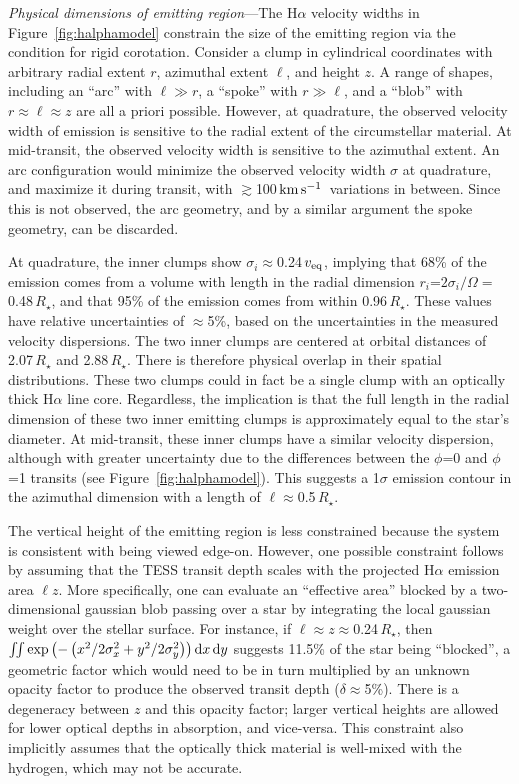 \documentclass[11pt,twocolumn,tighten,linenumbers]{aastex7}
\newcommand{\kms}{\ensuremath{\rm km\,s^{-1}}}
\begin{document}
{\it Physical dimensions of emitting region}---The H$\alpha$
velocity widths in Figure~\ref{fig:halphamodel} constrain
the size of the emitting region via the condition for rigid
corotation.  Consider a clump in cylindrical coordinates with
arbitrary radial extent $r$, azimuthal extent $\ell$, and height $z$.
A range of shapes, including an ``arc'' with $\ell \gg r$, a ``spoke''
with $r \gg \ell$, and a ``blob'' with $r \approx \ell \approx z$ are
all a priori possible.  However, at quadrature, the observed velocity
width of emission is sensitive to the radial extent of the
circumstellar material.  At mid-transit, the observed velocity width
is sensitive to the azimuthal extent.  An arc configuration would
minimize the observed velocity width $\sigma$ at quadrature, and
maximize it during transit, with $\gtrsim$100\,\kms\ variations in
between.  Since this is not observed, the arc geometry, and by a similar
argument the spoke geometry, can be discarded.  

At quadrature, the inner clumps show $\sigma_i$$\approx$0.24\,$v_{\rm
eq}$, implying that 68\% of the emission comes from a volume with
length in the radial dimension $r_i$=$2\sigma_i /
\Omega$$=$0.48\,$R_\star$, and that 95\% of the emission comes from
within 0.96\,$R_\star$.  These values have relative uncertainties of
$\approx$5\%, based on the uncertainties in the measured velocity
dispersions.  The two inner clumps are centered at orbital distances
of 2.07\,$R_\star$ and 2.88\,$R_\star$.  There is therefore physical
overlap in their spatial distributions.  These two clumps could in
fact be a single clump with an optically thick H$\alpha$ line core.
Regardless, the implication is that the full length in the radial
dimension of these two inner emitting clumps is approximately equal to
the star's diameter.  At mid-transit, these
inner clumps have a similar velocity dispersion, although with
greater uncertainty due to the differences between the $\phi$=0 and
$\phi$=1 transits (see Figure~\ref{fig:halphamodel}).
This suggests a 1$\sigma$ emission contour in the azimuthal dimension
with a length of $\ell$$\approx$0.5\,$R_\star$.

The vertical height of the emitting region is less constrained because
the system is consistent with being viewed edge-on.  However, one
possible constraint follows by assuming that the TESS transit depth scales
with the projected H$\alpha$ emission area $\ell z$.  
More specifically, one can evaluate an ``effective area'' blocked by a
two-dimensional gaussian blob passing over a star by integrating the
local gaussian weight over the stellar surface.  For instance, if
$\ell$$\approx$$z$$\approx$0.24\,$R_\star$, then
$\iint \exp \left(
  -\left( x^2/2\sigma_x^2 + y^2/2\sigma_y^2 \right)
\right) {\rm d}x \, {\rm d}y$
suggests 11.5\% of the star being ``blocked'', a geometric factor
which would need to be in turn multiplied by an unknown opacity factor
to produce the observed transit depth ($\delta$$\approx$5\%).  
There is a degeneracy between $z$ and this opacity
factor; larger vertical heights are allowed for lower optical depths
in absorption, and vice-versa.  This constraint also implicitly
assumes that the optically thick material is well-mixed with the
hydrogen, which may not be accurate.
\end{document}

